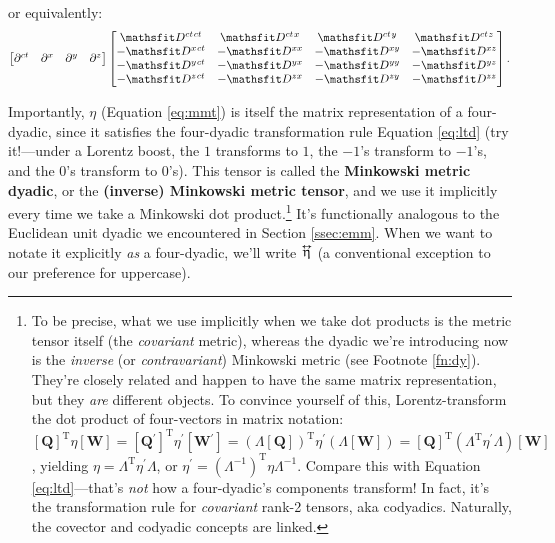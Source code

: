\documentclass[12pt]{article}
\renewcommand{\vv}[1]{\mathbf{#1}}
\newcommand{\tightoverset}[2]{%
  \mathop{#2}\limits^{\vbox to -.5ex{\kern-0.75ex\hbox{$#1$}\vss}}}
\newcommand{\inlinedy}[1]{\tightoverset{\text{\tiny$\bm\leftrightarrow$}}{#1}}
\begin{document}
or equivalently:
\begin{equation*}
\begin{bmatrix}
\partial^{ct} & \partial^x & \partial^y & \partial^z
\end{bmatrix}
\begin{bmatrix}
\mathsfit D^{ct \mkern1.5mu ct} & \mathsfit D^{ct \mkern1.5mu x} & \mathsfit D^{ct \mkern1.5mu y} & \mathsfit D^{ct \mkern1.5mu z} \\
- \mathsfit D^{x \mkern1.5mu ct} & - \mathsfit D^{x x} & - \mathsfit D^{x y} & - \mathsfit D^{x z}  \\
- \mathsfit D^{y \mkern1.5mu ct} & - \mathsfit D^{y x} & - \mathsfit D^{y y} & - \mathsfit D^{y z}  \\
- \mathsfit D^{z \mkern1.5mu ct} & - \mathsfit D^{z x} & - \mathsfit D^{z y} & - \mathsfit D^{z z} 
\end{bmatrix}.
\end{equation*}

Importantly, $\eta$ (Equation \ref{eq:mmt}) is itself the matrix representation of a four-dyadic, since it satisfies the four-dyadic transformation rule Equation \ref{eq:ltd} (try it!---under a Lorentz boost, the $1$ transforms to $1$, the $-1$'s transform to $-1$'s, and the $0$'s transform to $0$'s). This tensor is called the \textbf{Minkowski metric dyadic}, or the \textbf{(inverse) Minkowski metric tensor}, and we use it implicitly every time we take a Minkowski dot product.\footnote{\label{fn:cov}To be precise, what we use implicitly when we take dot products is the metric tensor itself (the \emph{covariant} metric), whereas the dyadic we're introducing now is the \emph{inverse} (or \emph{contravariant}) Minkowski metric (see Footnote \ref{fn:dy}). They're closely related and happen to have the same matrix representation, but they \emph{are} different objects. To convince yourself of this, Lorentz-transform the dot product of four-vectors in matrix notation: ${[ \vv Q ] ^\mathrm{T} \eta [ \vv W ] = [ \vv Q {}^\prime ] ^\mathrm{T} \eta ^\prime [ \vv W {}^\prime ] =  ( \Lambda [ \vv Q ] ) ^\mathrm{T} \eta ^\prime ( \Lambda [ \vv W ] ) = [ \vv Q ] ^\mathrm{T} ( \Lambda ^\mathrm{T} \eta^ \prime \Lambda ) [ \vv W ]} $, yielding $ \eta = \Lambda ^\mathrm{T} \eta^ \prime \Lambda $, or $\eta ^\prime = ( \Lambda ^{-1} ) ^\mathrm{T} \eta \Lambda ^{-1} $. Compare this with Equation \ref{eq:ltd}---that's \emph{not} how a four-dyadic's components transform! In fact, it's the transformation rule for \emph{covariant} rank-2 tensors, aka codyadics. Naturally, the covector and codyadic concepts are linked.} It's functionally analogous to the Euclidean unit dyadic we encountered in Section \ref{ssec:emm}. When we want to notate it explicitly \emph{as} a four-dyadic, we'll write $\inlinedy{\upeta}$ (a conventional exception to our preference for uppercase).
\end{document}

